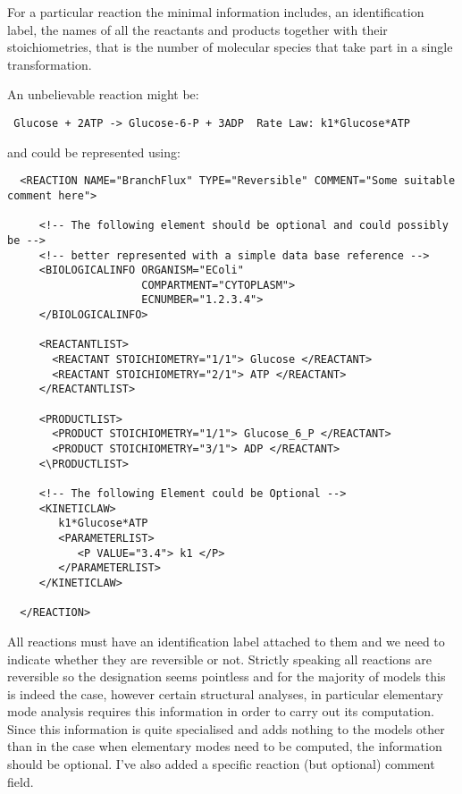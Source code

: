 \documentclass{article}
\begin{document}
For a particular reaction the minimal information includes, an identification
label, the names of all the reactants and products together with their
stoichiometries, that is the number of molecular species that take part in a
single transformation.

An unbelievable reaction might be:

\begin{verbatim} Glucose + 2ATP -> Glucose-6-P + 3ADP  Rate Law: k1*Glucose*ATP \end{verbatim}

and could be represented using:

{\footnotesize
\begin{verbatim}
  <REACTION NAME="BranchFlux" TYPE="Reversible" COMMENT="Some suitable comment here">

     <!-- The following element should be optional and could possibly be -->
     <!-- better represented with a simple data base reference -->
     <BIOLOGICALINFO ORGANISM="EColi"
                     COMPARTMENT="CYTOPLASM">
                     ECNUMBER="1.2.3.4">
     </BIOLOGICALINFO>

     <REACTANTLIST>
       <REACTANT STOICHIOMETRY="1/1"> Glucose </REACTANT>
       <REACTANT STOICHIOMETRY="2/1"> ATP </REACTANT>
     </REACTANTLIST>

     <PRODUCTLIST>
       <PRODUCT STOICHIOMETRY="1/1"> Glucose_6_P </REACTANT>
       <PRODUCT STOICHIOMETRY="3/1"> ADP </REACTANT>
     <\PRODUCTLIST>

     <!-- The following Element could be Optional -->
     <KINETICLAW>
        k1*Glucose*ATP
        <PARAMETERLIST>
           <P VALUE="3.4"> k1 </P>
        </PARAMETERLIST>
     </KINETICLAW>

  </REACTION>
\end{verbatim} }

All reactions must have an identification label attached to them and we need
to indicate whether they are reversible or not. Strictly speaking all
reactions are reversible so the designation seems pointless and for the
majority of models this is indeed the case, however certain structural
analyses, in particular elementary mode analysis requires this information in
order to carry out its computation. Since this information is quite
specialised and adds nothing to the models other than in the case when
elementary modes need to be computed, the information should be optional. I've
also added a specific reaction (but optional) comment field.
\end{document}
